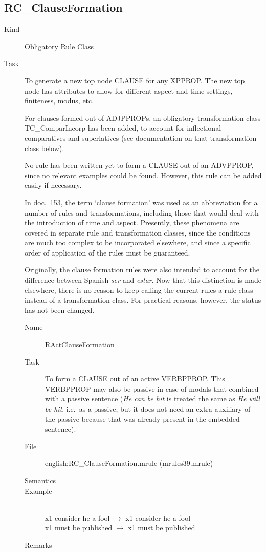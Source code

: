 \newpage
\subsection{RC\_ClauseFormation}

\begin{description}
\item[Kind] Obligatory Rule Class
\item[Task] To generate a new top node CLAUSE for any XPPROP.
The new top node has attributes to allow for different aspect and 
time settings, finiteness, modus, etc.

For clauses formed out of ADJPPROPs, an obligatory transformation class 
TC\_ComparIncorp has been added, to account for inflectional comparatives and 
superlatives (see documentation on that transformation class below).

No rule has been written yet to form a CLAUSE out of an ADVPPROP, since no 
relevant examples could be found. However, this rule can be added easily if 
necessary.

In doc.\ 153, the term `clause formation' was used as an abbreviation for a 
number of rules and transformations, including those that would deal with the 
introduction of time and aspect. Presently, these phenomena 
are covered in separate rule and transformation classes, since the conditions 
are much too complex 
to be incorporated elsewhere, and since a specific order of application of the 
rules must be guaranteed. 

Originally, the clause formation rules were also intended to account for the 
difference between Spanish {\em ser\/} and {\em estar\/}. Now that this 
distinction is made elsewhere, there is no reason to keep calling the current 
rules a rule class instead of a transformation class. For practical reasons, 
however, the status has not been changed.

\vspace{1 cm}
\begin{description}
\item[Name] RActClauseFormation
\item[Task] To form a CLAUSE out of an active VERBPPROP. This VERBPPROP may 
also be passive in case of modals that combined with a passive sentence
({\em He can be hit\/} is treated the same as {\em He will be hit\/}, i.e.\ as 
a passive, but it does not need an extra auxiliary of the passive because that 
was already present in the embedded sentence).
\item[File] english:RC\_ClauseFormation.mrule (mrules39.mrule)
\item[Semantics]
\item[Example] \mbox{}\\
x1 consider he a fool $\rightarrow$ x1 consider he a fool\\
x1 must be published $\rightarrow$ x1 must be published
\item[Remarks]
\end{description}


\end{description}
